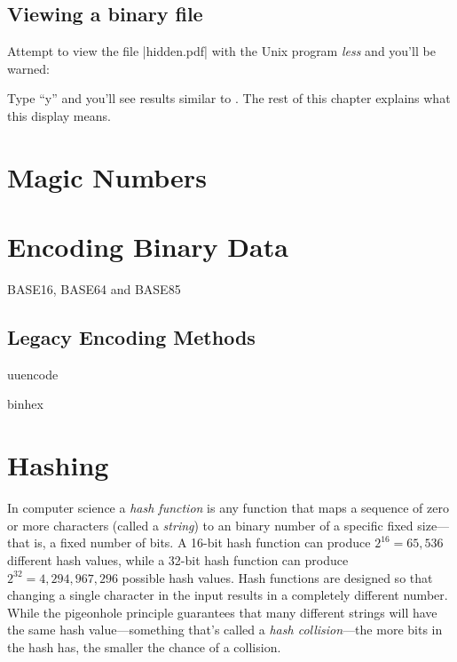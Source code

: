 \subsection{Viewing a binary file}

Attempt to view the file |hidden.pdf| with the
Unix program \emph{less} and you'll be warned:


Type ``y'' and you'll see results similar to
. The rest of this chapter explains what
this display means.

\section{Magic Numbers}

\section{Encoding Binary Data}

BASE16, BASE64 and BASE85

\subsection{Legacy Encoding Methods}
uuencode

binhex


\section{Hashing}

In computer science a \emph{hash function} is any function that maps a
sequence of zero or more characters (called a \emph{string}) to an
binary number of a specific fixed size---that is, a fixed number of
bits. A 16-bit hash function can produce $2^{16}=65,536$ different hash values, while a
32-bit hash function can produce $2^{32}=4,294,967,296$ possible hash
values. Hash functions are designed so that changing a single
character in the input results in a completely different number. While
the pigeonhole principle guarantees that many different strings will
have the same hash value---something that's called a \emph{hash
  collision}---the more bits in the hash has, the smaller the chance
of a collision.

